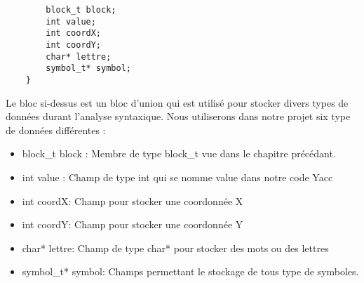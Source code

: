 \lstset{style=mystyle}
\begin{lstlisting}[caption=Union Yacc]
%union {
        block_t block;
        int value;
        int coordX;
        int coordY;
        char* lettre;
        symbol_t* symbol;
    }

\end{lstlisting}

Le bloc si-dessus est un bloc d'union qui est utilisé pour stocker divers types de données durant l'analyse syntaxique. Nous utiliserons dans notre projet six type de données différentes : 

\begin{itemize}
    \item block\_t block : Membre de type block\_t vue dans le chapitre précédant.
    \item int value : Champ de type int qui se nomme value dans notre code Yacc
    \item int coordX: Champ pour stocker une coordonnée X
    \item int coordY: Champ pour stocker une coordonnée Y
    \item char* lettre: Champ de type char* pour stocker des mots ou des lettres
    \item symbol\_t* symbol: Champs permettant le stockage de tous type de symboles.
\end{itemize}

\newpage